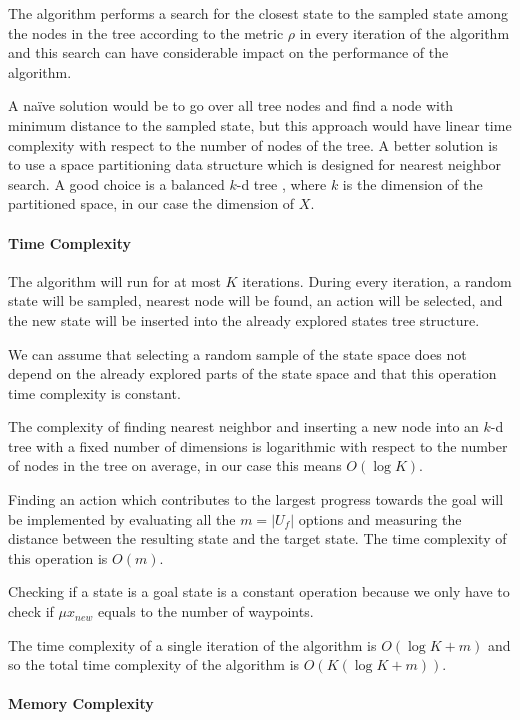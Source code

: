 The algorithm performs a search for the closest state to the sampled state among the nodes in the tree according to the metric $\rho$ in every iteration of the algorithm and this search can have considerable impact on the performance of the algorithm.

A naïve solution would be to go over all tree nodes and find a node with minimum distance to the sampled state, but this approach would have linear time complexity with respect to the number of nodes of the tree. A better solution is to use a space partitioning data structure which is designed for nearest neighbor search. A good choice is a balanced $k$-d tree \cite{kd-tree}, where $k$ is the dimension of the partitioned space, in our case the dimension of $X$.

\paragraph{Time Complexity}

The algorithm will run for at most $K$ iterations. During every iteration, a random state will be sampled, nearest node will be found, an action will be selected, and the new state will be inserted into the already explored states tree structure.

We can assume that selecting a random sample of the state space does not depend on the already explored parts of the state space and that this operation time complexity is constant.

The complexity of finding nearest neighbor and inserting a new node into an $k$-d tree with a fixed number of dimensions is logarithmic with respect to the number of nodes in the tree on average, in our case this means $O(\log K)$.

Finding an action which contributes to the largest progress towards the goal will be implemented by evaluating all the $m=|U_f|$ options and measuring the distance between the resulting state and the target state. The time complexity of this operation is $O(m)$.

Checking if a state is a goal state is a constant operation because we only have to check if $\mu{x_{new}}$ equals to the number of waypoints.

The time complexity of a single iteration of the algorithm is $O(\log K + m)$ and so the total time complexity of the algorithm is $O\left(K(\log K+m)\right)$.

\paragraph{Memory Complexity}

